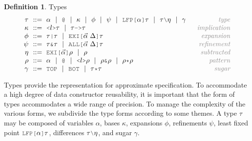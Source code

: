 \documentclass[acmsmall]{acmart}
\theoremstyle{definition}
\newtheorem{definition}{Definition}[section]
\begin{document}
\hfill
\begin{definition} Types 
  \label{def:types}
  \[\begin{array}[t]{r@{}l@{}r}
    \nonterm{\tau} & \is 
    \begin{array}[t]{@{}l}
      \alpha \sep
      \J{@} \sep
      \kappa \sep 
      \phi \sep 
      \psi \sep 
      \J{LFP[}\alpha\J{]}\tau \sep
      \tau \typdiff \eta \sep
      \gamma
    \end{array}
    & \com{type}
    \\
    \nonterm{\kappa} & \is 
    \begin{array}[t]{@{}l}
      \J{<} l \J{>} \tau \sep 
      \tau\J{->}\tau
    \end{array}
    & \com{implication}
    \\
    \nonterm{\phi} & \is 
    \begin{array}[t]{@{}l}
      \tau\J{|}\tau \sep 
      \J{EXI[}\vec{\alpha}\ \Delta \J{]} \tau
    \end{array}
    & \com{expansion}
    \\
    \nonterm{\psi} & \is 
    \begin{array}[t]{@{}l}
      \tau\J{\&}\tau \sep 
      \J{ALL[}\vec{\alpha}\ \Delta \J{]} \tau
    \end{array}
    & \com{refinement}
    \\
    \nonterm{\eta} & \is 
    \begin{array}[t]{@{}l}
      \J{EXI[}\vec{\alpha} \J{]} \rho \sep 
      \rho
    \end{array}
    & \com{subtracted}
    \\
    \nonterm{\rho} & \is 
    \begin{array}[t]{@{}l}
      \alpha \sep
      \J{@} \sep
      \J{<}l\J{>}\rho \sep 
      \rho\J{\&}\rho \sep
      \rho\J{*}\rho
    \end{array}
    & \com{pattern}
    \\
    \nonterm{\gamma} & \is 
    \begin{array}[t]{@{}l}
      \J{TOP} \sep \J{BOT} \sep 
      \tau \J{*} \tau 
    \end{array}
    & \com{sugar}
  \end{array}\]
\end{definition}
\hfill

Types provide the representation for approximate specification.
To accommodate a high degree of data constructor reusability,
it is important that the form of types accommodates a wide range of precision.
To manage the complexity of the various forms, we subdivide the type forms
according to some themes.
A type $\tau$ may be composed of variables $\alpha$, 
bases $\kappa$, expansions $\phi$, refinements $\psi$,
least fixed point $\J{LFP[}\alpha \J{]} \tau$,
differences $\tau \typdiff \eta$, and sugar $\gamma$.
\end{document}
